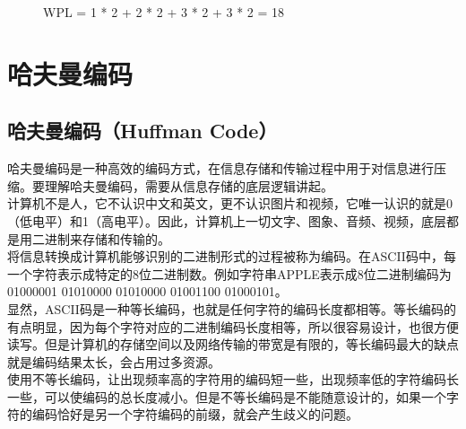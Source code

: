 \begin{figure}[H]
    \centering
    \caption{WPL = 1 * 2 + 2 * 2 + 3 * 2 + 3 * 2 = 18}
\end{figure}

\newpage

\section{哈夫曼编码}

\subsection{哈夫曼编码（Huffman Code）}

哈夫曼编码是一种高效的编码方式，在信息存储和传输过程中用于对信息进行压缩。要理解哈夫曼编码，需要从信息存储的底层逻辑讲起。 \\

计算机不是人，它不认识中文和英文，更不认识图片和视频，它唯一认识的就是0（低电平）和1（高电平）。因此，计算机上一切文字、图象、音频、视频，底层都是用二进制来存储和传输的。 \\

将信息转换成计算机能够识别的二进制形式的过程被称为编码。在ASCII码中，每一个字符表示成特定的8位二进制数。例如字符串APPLE表示成8位二进制编码为01000001 01010000 01010000 01001100 01000101。 \\

显然，ASCII码是一种等长编码，也就是任何字符的编码长度都相等。等长编码的有点明显，因为每个字符对应的二进制编码长度相等，所以很容易设计，也很方便读写。但是计算机的存储空间以及网络传输的带宽是有限的，等长编码最大的缺点就是编码结果太长，会占用过多资源。 \\

使用不等长编码，让出现频率高的字符用的编码短一些，出现频率低的字符编码长一些，可以使编码的总长度减小。但是不等长编码是不能随意设计的，如果一个字符的编码恰好是另一个字符编码的前缀，就会产生歧义的问题。 \\

